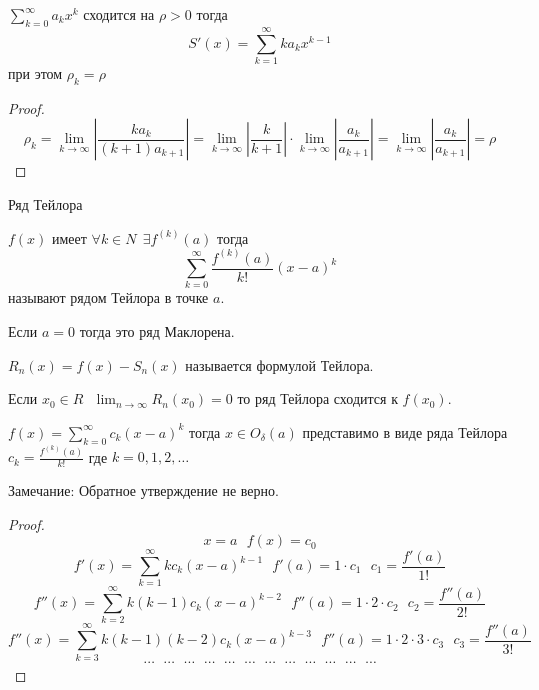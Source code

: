 \begin{block}[Следствие 3]
  $\sum_{k=0}^{\infty} a_k x^k$ сходится на $\rho > 0$ тогда
  $$
  S'(x) = \sum_{k=1}^{\infty}k a_k x^{k-1}
  $$
  при этом $\rho_k = \rho$
\end{block}

\begin{proof}
  $$
  \rho_k = \lim_{k \to \infty} \left| \frac{k a_k}{(k+1)a_{k+1}} \right| =
  \lim_{k \to \infty} \left| \frac{k}{k+1} \right| \cdot
  \lim_{k \to \infty} \left| \frac{a_k}{a_{k+1}} \right| =
  \lim_{k \to \infty} \left| \frac{a_k}{a_{k+1}} \right| = \rho
  $$
\end{proof}

\begin{title}[\Large]
  Ряд Тейлора
\end{title}

\begin{define}
  $f(x)$ имеет $\forall k \in N ~~ \exists f^{(k)}(a)$ тогда
  $$
  \sum_{k=0}^{\infty} \frac{f^{(k)}(a)}{k!} (x-a)^k
  $$
  называют рядом Тейлора в точке $a$.

  Если $a = 0$ тогда это ряд Маклорена.

  $R_n(x) = f(x) - S_n(x)$ называется формулой Тейлора.

  Если $x_0 \in R ~~~ \lim_{n \to \infty} R_n(x_0) = 0$ то ряд Тейлора сходится
  к $f(x_0)$.
\end{define}

\begin{theorem}
  $f(x) = \sum_{k=0}^{\infty} c_k(x-a)^k$ тогда $x \in O_{\delta}(a)$
  представимо в виде ряда Тейлора
  $c_k = \frac{f^{(k)}(a)}{k!}$ где $k = 0,1,2, \ldots$

  Замечание: Обратное утверждение не верно.
\end{theorem}

\begin{proof}
  $$
  x = a ~~~ f(x) = c_0
  $$
  $$
  f'(x) = \sum_{k=1}^{\infty} k c_k(x - a)^{k - 1} ~~~ f'(a) = 1 \cdot c_1 ~~~
  c_1 = \frac{f'(a)}{1!}
  $$
  $$
  f''(x) = \sum_{k=2}^{\infty} k(k-1) c_k (x - a)^{k-2} ~~~
  f''(a) = 1 \cdot 2 \cdot c_2 ~~~ c_2 = \frac{f''(a)}{2!}
  $$
  $$
  f''(x) = \sum_{k=3}^{\infty} k(k-1)(k-2) c_k (x - a)^{k-3} ~~~
  f''(a) = 1 \cdot 2 \cdot 3 \cdot c_3 ~~~ c_3 = \frac{f''(a)}{3!}
  $$
  $$
  \cdots ~~~ \cdots ~~~ \cdots ~~~ \cdots ~~~ \cdots ~~~ \cdots
  ~~~ \cdots ~~~ \cdots ~~~ \cdots ~~~ \cdots ~~~ \cdots ~~~ \cdots
  $$
\end{proof}


